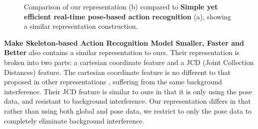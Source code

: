 \begin{figure}[ht]
	\centering
	\caption{Comparison of our representation (b) compared to \textbf{Simple yet efficient real-time pose-based action recognition} \cite{simple_yet_efficient} (a), showing a similar representation construction.}
	\label{fig:simple-v-ours}
\end{figure}

\iffalse
\begin{figure}[ht]
	\subfigure[]{\texttt{[image: smallerfasterbetterv2]}}
	\subfigure[]{\texttt{[image: IntermediateStacked]}}
	\centering
	\caption{Similar representations of our novel representation (b) compared to that of \textbf{Make Skeleton-based Action Recognition Model Smaller, Faster and Better} \cite{smaller_faster_better} (a).}
	\label{fig:smaller-v-ours}
\end{figure}
\fi

\textbf{Make Skeleton-based Action Recognition Model Smaller, Faster and Better} \cite{smaller_faster_better} also contains a similar representation to ours. Their representation is broken into two parts: a cartesian coordinate feature and a JCD (Joint Collection Distances) feature. The cartesian coordinate feature is no different to that proposed in other representations \cite{simple_yet_efficient}, suffering from the same background interference. Their JCD feature is similar to ours in that it is only using the pose data, and resistant to background interference. Our representation differs in that rather than using both global and pose data, we restrict to only the pose data to completely eliminate background interference.

